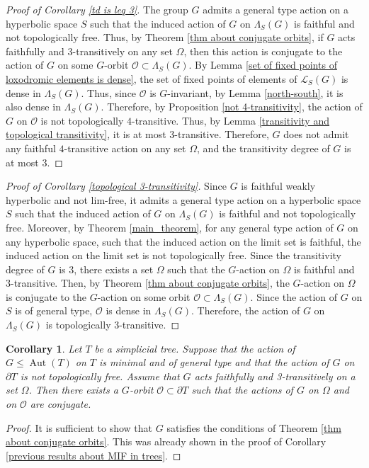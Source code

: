\documentclass[11pt,letterpaper]{article}
\DeclareMathOperator{\Aut}{Aut}
\newtheorem{cor}[thm]{Corollary}
\theoremstyle{definition}
\theoremstyle{remark}
\begin{document}
\begin{proof}[Proof of Corollary \ref{td is leq 3}]
The group $G$ admits a general type action on a hyperbolic space $S$ such that the induced action of $G$ on $\Lambda_S(G)$ is faithful and not topologically free. Thus, by Theorem \ref{thm about conjugate orbits}, if $G$ acts faithfully and 3-transitively on any set $\Omega$, then this action is conjugate to the action of $G$ on some $G$-orbit $\mathcal{O} \subset \Lambda_S(G)$.  By Lemma \ref{set of fixed points of loxodromic elements is dense}, the set of fixed points of elements of $\mathcal{L}_S(G)$ is dense in $\Lambda_S(G)$. Thus, since $\mathcal{O}$ is $G$-invariant, by Lemma \ref{north-south}, it is also dense in $\Lambda_S(G)$. Therefore, by Proposition \ref{not 4-transitivity}, the action of $G$ on $\mathcal{O}$ is not topologically $4$-transitive. Thus, by Lemma \ref{transitivity and topological transitivity}, it is at most $3$-transitive. Therefore, $G$ does not admit any faithful $4$-transitive action on any set $\Omega$, and the transitivity degree of $G$ is at most $3$.
\end{proof}

\begin{proof}[Proof of Corollary \ref{topological 3-transitivity}]
Since $G$ is faithful weakly hyperbolic and not lim-free, it admits a general type action on a hyperbolic space $S$ such that the induced action of $G$ on $\Lambda_S(G)$ is faithful and not topologically free. Moreover, by Theorem \ref{main_theorem}, for any general type action of $G$ on any hyperbolic space, such that the induced action on the limit set is faithful, the induced action on the limit set is not topologically free. Since the transitivity degree of $G$ is $3$, there exists a set $\Omega$ such that the $G$-action on $\Omega$ is faithful and $3$-transitive. Then, by Theorem \ref{thm about conjugate orbits}, the $G$-action on $\Omega$ is conjugate to the $G$-action on some orbit $\mathcal{O} \subset \Lambda_S(G)$. Since the action of $G$ on $S$ is of general type, $\mathcal{O}$ is dense in $\Lambda_S(G)$. Therefore, the action of $G$ on $\Lambda_S(G)$ is topologically $3$-transitive. \end{proof}

\begin{cor}\cite[Theorem 1.4]{BM}\label{conjugate orbits for trees}
Let $T$ be a simplicial tree. Suppose that the action of $G \leq \Aut(T)$ on $T$ is minimal and of general type and that the action of $G$ on $\partial T$ is not topologically free. Assume that $G$ acts faithfully and 3-transitively on a set $\Omega$. Then there exists a $G$-orbit $\mathcal{O} \subset \partial T$ such that the actions of $G$ on $\Omega$ and on $\mathcal{O}$ are conjugate. 
\end{cor}
\begin{proof}
    It is sufficient to show that $G$ satisfies the conditions of Theorem \ref{thm about conjugate orbits}. This was already shown in the proof of Corollary \ref{previous results about MIF in trees}.
\end{proof}
\end{document}
